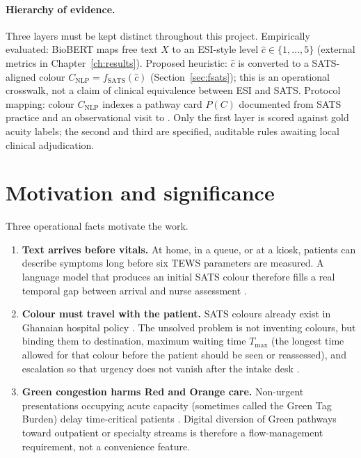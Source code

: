 \paragraph{Hierarchy of evidence.}
Three layers must be kept distinct throughout this project. Empirically evaluated: BioBERT maps free text \(X\) to an ESI-style level \(\hat{c}\in\{1,\ldots,5\}\) (external metrics in Chapter~\ref{ch:results}). Proposed heuristic: \(\hat{c}\) is converted to a SATS-aligned colour \(C_{\mathrm{NLP}}=f_{\mathrm{SATS}}(\hat{c})\) (Section~\ref{sec:fsats}); this is an operational crosswalk, not a claim of clinical equivalence between ESI and SATS. Protocol mapping: colour \(C_{\mathrm{NLP}}\) indexes a pathway card \(P(C)\) documented from SATS practice and an observational visit to \examplehospital{}. Only the first layer is scored against gold acuity labels; the second and third are specified, auditable rules awaiting local clinical adjudication.

\section{Motivation and significance}

Three operational facts motivate the work.

\begin{enumerate}
\item \textbf{Text arrives before vitals.} At home, in a queue, or at a kiosk, patients can describe symptoms long before six TEWS parameters are measured. A language model that produces an initial SATS colour therefore fills a real temporal gap between arrival and nurse assessment \citep{stewart2023nlp}.
\item \textbf{Colour must travel with the patient.} SATS colours already exist in Ghanaian hospital policy \citep{Rominski2014,kathsats}. The unsolved problem is not inventing colours, but binding them to destination, maximum waiting time \(T_{\max}\) (the longest time allowed for that colour before the patient should be seen or reassessed), and escalation so that urgency does not vanish after the intake desk \citep{satsmanual,Sundstrom2014}.
\item \textbf{Green congestion harms Red and Orange care.} Non-urgent presentations occupying acute capacity (sometimes called the Green Tag Burden) delay time-critical patients \citep{Yilmaz2021}. Digital diversion of Green pathways toward outpatient or specialty streams is therefore a flow-management requirement, not a convenience feature.
\end{enumerate}

